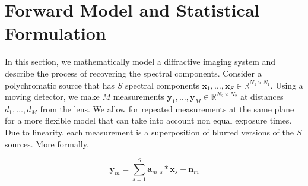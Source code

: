 \documentclass{article}
\begin{document}


\section{Forward Model and Statistical Formulation}
\label{sec:format}
In this section, we mathematically model a diffractive imaging system and
describe the process of recovering the spectral components. Consider a
polychromatic source that has $S$ spectral components $\bm{x}_1, \dots,
\bm{x}_S \in \mathbb R^{N_1\times N_1}$. Using a moving detector, we make $M$ measurements $\bm{y}_1, \dots,
\bm{y}_M \in \mathbb R^{N_2\times N_2}$ at distances $d_1, \dots, d_M$ from the lens. We allow for repeated
measurements at the same plane for a more flexible model that can take into
account non equal exposure times.
Due to linearity, each measurement is a superposition of blurred versions of the
$S$ sources. More formally,

\begin{equation}
\bm{y}_m = \sum_{s=1}^S \bm{a}_{m,s} \ast \bm{x}_s + \bm{n}_m
\label{eq:fwd_model}
\end{equation}
\end{document}

